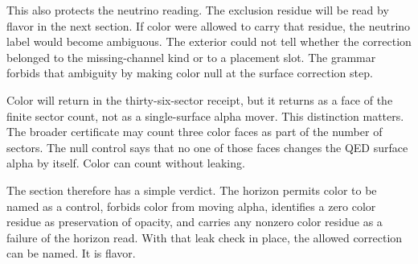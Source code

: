 This also protects the neutrino reading. The exclusion residue will be read
by flavor in the next section. If color were allowed to carry that residue,
the neutrino label would become ambiguous. The exterior could not tell
whether the correction belonged to the missing-channel kind or to a
placement slot. The grammar forbids that ambiguity by making color null at
the surface correction step.

Color will return in the thirty-six-sector receipt, but it returns as a
face of the finite sector count, not as a single-surface alpha mover. This
distinction matters. The broader certificate may count three color faces as
part of the number of sectors. The null control says that no one of those
faces changes the QED surface alpha by itself. Color can count without
leaking.

The section therefore has a simple verdict. The horizon permits color to be
named as a control, forbids color from moving alpha, identifies a zero color
residue as preservation of opacity, and carries any nonzero color residue as
a failure of the horizon read. With that leak check in place, the allowed
correction can be named. It is flavor.

